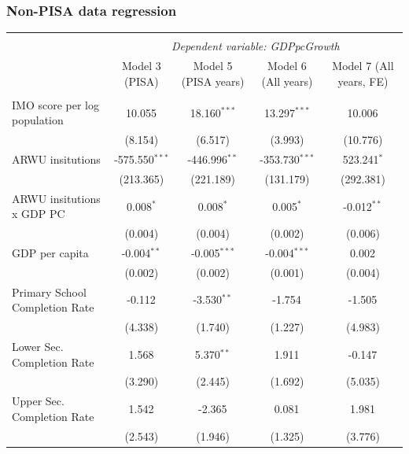 \documentclass[10pt]{beamer}
\begin{document}
\begin{frame}
    \frametitle{Non-PISA data regression}
    \begin{table}[!htbp] \centering
        \resizebox{\linewidth}{!} {
            \begin{tabular}{@{\extracolsep{5pt}}lcccc}
                \\[-1.8ex]\hline
                \hline \\[-1.8ex]
                & \multicolumn{4}{c}{\textit{Dependent variable: GDPpcGrowth}} \
                \cr \cline{2-5}
                \\[-1.8ex] & \multicolumn{1}{c}{Model 3 (PISA)} & \multicolumn{1}{c}{Model 5 (PISA years)} & \multicolumn{1}{c}{Model 6 (All years)} & \multicolumn{1}{c}{Model 7 (All years, FE)}  \\
                \hline \\[-1.8ex]
                 IMO score per log population & 10.055$^{}$ & 18.160$^{***}$ & 13.297$^{***}$ & 10.006$^{}$ \\
                & (8.154) & (6.517) & (3.993) & (10.776) \\
                 ARWU insitutions & -575.550$^{***}$ & -446.996$^{**}$ & -353.730$^{***}$ & 523.241$^{*}$ \\
                & (213.365) & (221.189) & (131.179) & (292.381) \\
                 ARWU insitutions x GDP PC & 0.008$^{*}$ & 0.008$^{*}$ & 0.005$^{*}$ & -0.012$^{**}$ \\
                & (0.004) & (0.004) & (0.002) & (0.006) \\
                 GDP per capita & -0.004$^{**}$ & -0.005$^{***}$ & -0.004$^{***}$ & 0.002$^{}$ \\
                & (0.002) & (0.002) & (0.001) & (0.004) \\
                 Primary School Completion Rate & -0.112$^{}$ & -3.530$^{**}$ & -1.754$^{}$ & -1.505$^{}$ \\
                & (4.338) & (1.740) & (1.227) & (4.983) \\
                 Lower Sec. Completion Rate & 1.568$^{}$ & 5.370$^{**}$ & 1.911$^{}$ & -0.147$^{}$ \\
                & (3.290) & (2.445) & (1.692) & (5.035) \\
                 Upper Sec. Completion Rate & 1.542$^{}$ & -2.365$^{}$ & 0.081$^{}$ & 1.981$^{}$ \\
                & (2.543) & (1.946) & (1.325) & (3.776) \\

\end{tabular}}
\end{table}
\end{frame}
\end{document}
